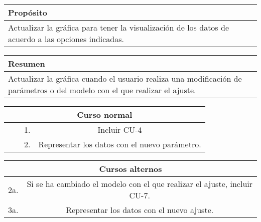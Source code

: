 \begin{table}[!h]
\begin{tabularx}{\textwidth}{|Y|}
\hline
{} \textbf{Propósito} \\
\hline
Actualizar la gráfica para tener la visualización de los datos de acuerdo a las opciones indicadas.   \\
\hline
\end{tabularx}
\end{table}

\begin{table}[!h]
\begin{tabularx}{\textwidth}{|Y|}
\hline
{} \textbf{Resumen}  \\
\hline
Actualizar la gráfica cuando el usuario realiza una modificación de parámetros o del modelo con el que realizar el ajuste.  \\
\hline
\end{tabularx}
\end{table}

\begin{table}[!h]
\begin{tabular}{|c|c|c|c|}
\hline
\multicolumn{4}{|c|}{\cellcolor{cyan} \textbf{Curso normal}} \\
\hline
              &               &      1.        &     Incluir CU-4         \\
\hline
              &               &      2.        &     Representar los datos con el nuevo parámetro.         \\
\hline
\end{tabular}
\end{table}

\begin{table}[!h]
\begin{tabular}{|c|c|}
\hline
\multicolumn{2}{|c|}{\cellcolor{cyan} \textbf{Cursos alternos}} \\
\hline
      2a.        &     Si se ha cambiado el modelo con el que realizar el ajuste, incluir CU-7.         \\
\hline
      3a.        &     Representar los datos con el nuevo ajuste.         \\
\hline
\end{tabular}
\end{table}

